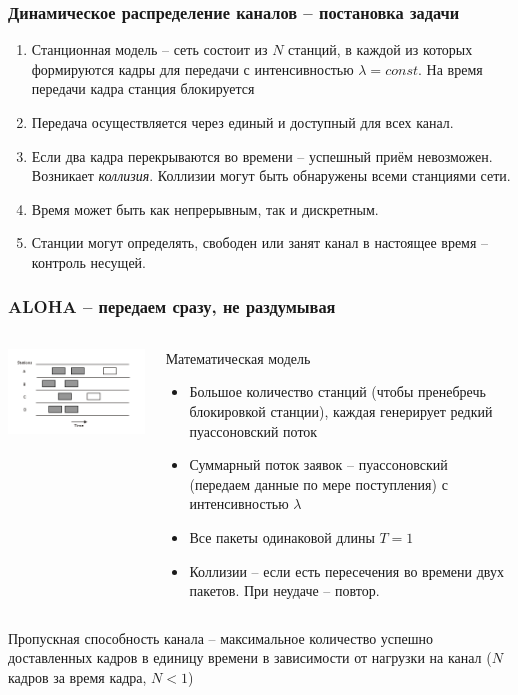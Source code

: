 \documentclass[utf8]{beamer}
\begin{document}
\begin{frame}
\frametitle{Динамическое распределение каналов -- постановка задачи}
\begin{enumerate}
\item Станционная модель -- сеть состоит из $N$ станций, в каждой из которых формируются кадры для передачи с интенсивностью $\lambda = const$. На время передачи кадра станция блокируется
\item Передача осуществляется через единый и доступный для всех канал.
\item Если два кадра перекрываются во времени -- успешный приём невозможен. Возникает \emph{коллизия}. Коллизии могут быть обнаружены всеми станциями сети.
\item Время может быть как непрерывным, так и дискретным.
\item Станции могут определять, свободен или занят канал в настоящее время -- контроль несущей.
\end{enumerate}
\end{frame}
\begin{frame}
\frametitle{ALOHA -- передаем сразу, не раздумывая}
\begin{columns}
\begin{block}{}
\centering
\includegraphics[width=1.2\textwidth]{pic/pure-aloha.png}
\end{block}
\begin{block}{Математическая модель}
\begin{itemize}
        \item Большое количество станций (чтобы пренебречь блокировкой станции), каждая генерирует редкий пуассоновский поток
        \item Суммарный поток заявок -- пуассоновский (передаем данные по мере поступления) с интенсивностью $\lambda$
        \item Все пакеты одинаковой длины $T = 1$
        \item Коллизии -- если есть пересечения во времени двух пакетов. При неудаче -- повтор.
\end{itemize}
\end{block}
\end{columns}
Пропускная способность канала -- максимальное количество успешно доставленных кадров в единицу времени в зависимости от нагрузки на канал ($N$ кадров за время кадра, $N < 1$)
\end{frame}
\end{document}
